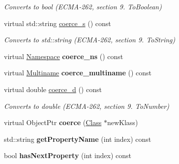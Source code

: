 \begin{DoxyCompactItemize}
\begin{DoxyCompactList}\small\item\em Converts to {\ttfamily bool} (E\+C\+M\+A-\/262, section 9. {\itshape To\+Boolean}) \end{DoxyCompactList}\item 
virtual std\+::string \hyperlink{classjswf_1_1avm2_1_1_object_a69b39776062acaccd2cd2b5a1f937c9d}{coerce\+\_\+s} () const 
\begin{DoxyCompactList}\small\item\em Converts to {\ttfamily std\+::string} (E\+C\+M\+A-\/262, section 9. {\itshape To\+String}) \end{DoxyCompactList}\item 
\hypertarget{classjswf_1_1avm2_1_1_object_ae70efbb4c5dc0506dd0f25aa2edc7033}{virtual \hyperlink{structjswf_1_1avm2_1_1_namespace}{Namespace} {\bfseries coerce\+\_\+ns} () const }\label{classjswf_1_1avm2_1_1_object_ae70efbb4c5dc0506dd0f25aa2edc7033}

\item 
\hypertarget{classjswf_1_1avm2_1_1_object_ad060c6ca029ad1158173bd2f20a6bd07}{virtual \hyperlink{structjswf_1_1avm2_1_1_multiname}{Multiname} {\bfseries coerce\+\_\+multiname} () const }\label{classjswf_1_1avm2_1_1_object_ad060c6ca029ad1158173bd2f20a6bd07}

\item 
\hypertarget{classjswf_1_1avm2_1_1_object_ac2804e1879e170ae43cea1f17efbb7e8}{virtual double \hyperlink{classjswf_1_1avm2_1_1_object_ac2804e1879e170ae43cea1f17efbb7e8}{coerce\+\_\+d} () const }\label{classjswf_1_1avm2_1_1_object_ac2804e1879e170ae43cea1f17efbb7e8}

\begin{DoxyCompactList}\small\item\em Converts to {\ttfamily double} (E\+C\+M\+A-\/262, section 9. {\itshape To\+Number}) \end{DoxyCompactList}\item 
\hypertarget{classjswf_1_1avm2_1_1_object_afedcb68d25763184499b1c7c0ea99c7d}{virtual Object\+Ptr {\bfseries coerce} (\hyperlink{classjswf_1_1avm2_1_1_class}{Class} $\ast$new\+Klass)}\label{classjswf_1_1avm2_1_1_object_afedcb68d25763184499b1c7c0ea99c7d}

\item 
\hypertarget{classjswf_1_1avm2_1_1_object_a2eaa32c64fedbb664b5531a2c7e7dbb5}{std\+::string {\bfseries get\+Property\+Name} (int index) const }\label{classjswf_1_1avm2_1_1_object_a2eaa32c64fedbb664b5531a2c7e7dbb5}

\item 
\hypertarget{classjswf_1_1avm2_1_1_object_acb1bda095198b9996549b227428403c0}{bool {\bfseries has\+Next\+Property} (int index) const }\label{classjswf_1_1avm2_1_1_object_acb1bda095198b9996549b227428403c0}

\end{DoxyCompactItemize}
